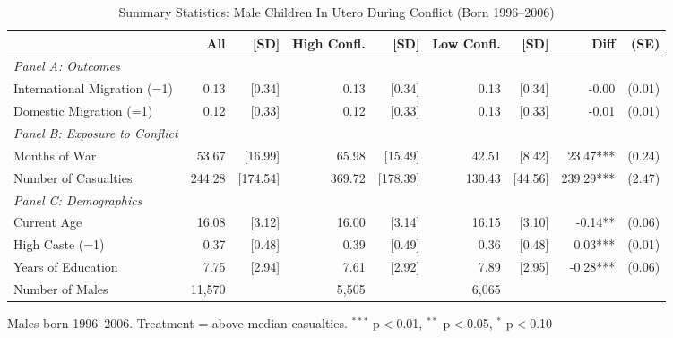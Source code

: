\clearpage

\begin{table}[htbp]
\centering
\footnotesize
\caption{Summary Statistics: Male Children In Utero During Conflict (Born 1996--2006)}
\label{tab:males_in_utero}
\begin{tabular}{lrrrrrrrr}
\toprule
 & All & [SD] & High Confl. & [SD] & Low Confl. & [SD] & Diff & (SE) \\
\midrule
\textit{Panel A: Outcomes} & & & & & & & & \\
\quad International Migration (=1) & 0.13 & [0.34] & 0.13 & [0.34] & 0.13 & [0.34] & -0.00 & (0.01) \\
\quad Domestic Migration (=1) & 0.12 & [0.33] & 0.12 & [0.33] & 0.13 & [0.33] & -0.01 & (0.01) \\
\textit{Panel B: Exposure to Conflict} & & & & & & & & \\
\quad Months of War & 53.67 & [16.99] & 65.98 & [15.49] & 42.51 & [8.42] & 23.47*** & (0.24) \\
\quad Number of Casualties & 244.28 & [174.54] & 369.72 & [178.39] & 130.43 & [44.56] & 239.29*** & (2.47) \\
\textit{Panel C: Demographics} & & & & & & & & \\
\quad Current Age & 16.08 & [3.12] & 16.00 & [3.14] & 16.15 & [3.10] & -0.14** & (0.06) \\
\quad High Caste (=1) & 0.37 & [0.48] & 0.39 & [0.49] & 0.36 & [0.48] & 0.03*** & (0.01) \\
\quad Years of Education & 7.75 & [2.94] & 7.61 & [2.92] & 7.89 & [2.95] & -0.28*** & (0.06) \\
\quad Number of Males & 11,570 &  & 5,505 &  & 6,065 &  &  &  \\
\bottomrule
\end{tabular}
\begin{tablenotes}
\footnotesize
\item Males born 1996--2006. Treatment = above-median casualties. $^{***}$ p$<$0.01, $^{**}$ p$<$0.05, $^{*}$ p$<$0.10
\end{tablenotes}
\end{table}

\clearpage

